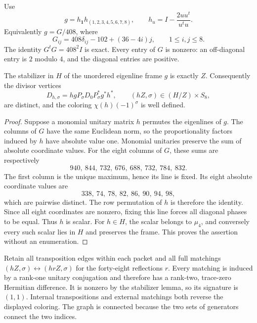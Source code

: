 Use
\[
 g=h_{\mathbf1}h_{(1,2,3,4,5,6,7,8)},\qquad
 h_u=I-\frac{2uu^t}{u^tu}.
\]
Equivalently \(g=G/408\), where
\begin{equation}
 G_{ij}=408\delta_{ij}-102+(36-4i)j,
 \qquad 1\le i,j\le8.
 \label{eq:gaussian-exact-frame}
\end{equation}
The identity \(G^tG=408^2I\) is exact.  Every entry of \(G\)
is nonzero: an off-diagonal entry is \(2\) modulo \(4\), and the
diagonal entries are positive.

\begin{lemma}\label{lem:gaussian-trace-frame}
The stabilizer in \(H\) of the unordered eigenline frame \(g\)
is exactly \(Z\).  Consequently the divisor vertices
\[
 D_{h,\sigma}=hgP_\sigma D_0P_\sigma^*g^*h^*,
 \qquad (hZ,\sigma)\in(H/Z)\times S_8,
\]
are distinct, and the coloring \(\chi(h)(-1)^\sigma\) is
well defined.
\end{lemma}

\begin{proof}
Suppose a monomial unitary matrix \(h\) permutes the eigenlines of
\(g\).  The columns of \(G\) have the same Euclidean norm, so the
proportionality factors induced by \(h\) have absolute value one.
Monomial unitaries preserve the sum of absolute coordinate values.
For the eight columns of \(G\), these sums are respectively
\[
 940,\ 844,\ 732,\ 676,\ 688,\ 732,\ 784,\ 832.
\]
The first column is the unique maximum, hence its line is fixed.
Its eight absolute coordinate values are
\[
 338,\ 74,\ 78,\ 82,\ 86,\ 90,\ 94,\ 98,
\]
which are pairwise distinct.  The row permutation of \(h\) is
therefore the identity.  Since all eight coordinates are nonzero,
fixing this line forces all diagonal phases to be equal.  Thus
\(h\) is scalar.  For \(h\in H\), the scalar belongs to \(\mu_4\),
and conversely every such scalar lies in \(H\) and preserves the
frame.  This proves the assertion without an enumeration.
\end{proof}

Retain all transposition edges within each packet and all full
matchings \((hZ,\sigma)\leftrightarrow(hrZ,\sigma)\) for the
forty-eight reflections \(r\).  Every matching is induced by a
rank-one unitary conjugation and therefore has a rank-two,
trace-zero Hermitian difference.  It is nonzero by the stabilizer
lemma, so its signature is \((1,1)\).  Internal transpositions and
external matchings both reverse the displayed coloring.  The graph
is connected because the two sets of generators connect the two
indices.

